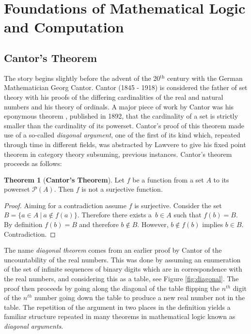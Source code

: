 \theoremstyle{definition}
\newtheorem{theorem}{Theorem}
\newtheorem*{theorem*}{Theorem}
\newtheorem{definition}{Definition}
\newtheorem*{definition*}{Definition}

\section{Foundations of Mathematical Logic and Computation}

\subsection{Cantor's Theorem}

The story begins slightly before the advent of the 20$^{\textrm{th}}$ century
with the German Mathematician Georg Cantor. Cantor (1845 - 1918) is considered
the father of set theory with his proofs of the differing cardinalities of the
real and natural numbers and his theory of ordinals. A major piece of work by Cantor
was his eponymous theorem \cite{cantor1892ueber}, published in 1892, that the
cardinality of a set is strictly smaller than the cardinality of its powerset.
Cantor's proof of this theorem made use of a so-called \textit{diagonal
argument}, one of the first of its kind which, repeated through time in
different fields, was abstracted by Lawvere to give his fixed point theorem in
category theory subsuming, previous instances. Cantor's theorem proceeds as
follows:

\begin{theorem*}[\textbf{Cantor's Theorem}]
    Let $f$ be a function from a set $A$ to its powerset $\mathcal{P}(A)$. Then
    $f$ is not a surjective function.
\end{theorem*}

\begin{proof}
    Aiming for a contradiction assume $f$ is surjective. Consider the set $B =
    \{ a \in A \: | \: a \not\in f(a) \}$. Therefore there exists a  $\, b \in A$
    such that $f(b)=B$. By definition $f(b) = B$ and therefore $b \not\in B$.
    However, $b \not\in f(b)$ implies $b \in B$. Contradiction.
\end{proof}
The name \textit{diagonal theorem} comes from an earlier proof by Cantor of the
uncountability of the real numbers. This was done by assuming an enumeration of
the set of infinite sequences of binary digits which are in correspondence with
the real numbers, and considering this as a table, see Figure
\ref{fig:diagonal}. The proof then proceeds by going along the diagonal of the
table flipping the $n^{th}$ digit of the $n^{th}$ number going down the table to
produce a new real number not in the table. The repetition of the argument in
two places in the definition yields a familiar structure repeated in many
theorems in mathematical logic known as \textit{diagonal arguments}.

